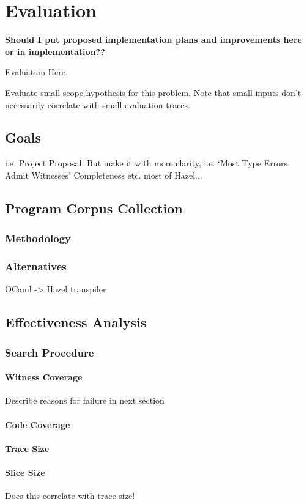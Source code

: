 \chapter{Evaluation}
\textbf{Should I put proposed implementation plans and improvements here or in implementation??}

Evaluation Here.\par 
Evaluate small scope hypothesis for this problem. Note that small inputs don't necessarily correlate with small evaluation traces.

\section{Goals}
i.e. Project Proposal. But make it with more clarity, i.e. `Most Type Errors Admit Witnesses'
Completeness etc. most of Hazel...

\section{Program Corpus Collection}
\subsection{Methodology}
\subsection{Alternatives}
OCaml -> Hazel transpiler

\section{Effectiveness Analysis}

\subsection{Search Procedure}
\subsubsection{Witness Coverage}
Describe reasons for failure in next section
\subsubsection{Code Coverage}
\subsubsection{Trace Size}
\subsubsection{Slice Size}
Does this correlate with trace size!

